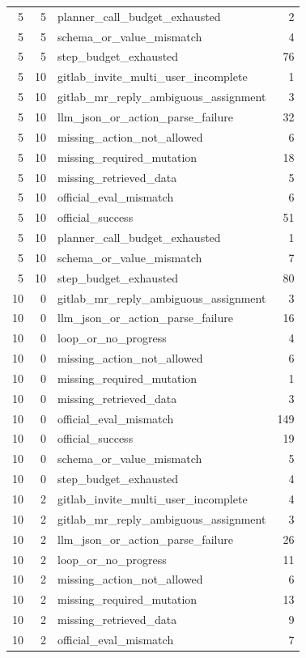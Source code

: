 \begin{tabular}{rrlr}
5 & 5 & planner_call_budget_exhausted & 2 \\
5 & 5 & schema_or_value_mismatch & 4 \\
5 & 5 & step_budget_exhausted & 76 \\
5 & 10 & gitlab_invite_multi_user_incomplete & 1 \\
5 & 10 & gitlab_mr_reply_ambiguous_assignment & 3 \\
5 & 10 & llm_json_or_action_parse_failure & 32 \\
5 & 10 & missing_action_not_allowed & 6 \\
5 & 10 & missing_required_mutation & 18 \\
5 & 10 & missing_retrieved_data & 5 \\
5 & 10 & official_eval_mismatch & 6 \\
5 & 10 & official_success & 51 \\
5 & 10 & planner_call_budget_exhausted & 1 \\
5 & 10 & schema_or_value_mismatch & 7 \\
5 & 10 & step_budget_exhausted & 80 \\
10 & 0 & gitlab_mr_reply_ambiguous_assignment & 3 \\
10 & 0 & llm_json_or_action_parse_failure & 16 \\
10 & 0 & loop_or_no_progress & 4 \\
10 & 0 & missing_action_not_allowed & 6 \\
10 & 0 & missing_required_mutation & 1 \\
10 & 0 & missing_retrieved_data & 3 \\
10 & 0 & official_eval_mismatch & 149 \\
10 & 0 & official_success & 19 \\
10 & 0 & schema_or_value_mismatch & 5 \\
10 & 0 & step_budget_exhausted & 4 \\
10 & 2 & gitlab_invite_multi_user_incomplete & 4 \\
10 & 2 & gitlab_mr_reply_ambiguous_assignment & 3 \\
10 & 2 & llm_json_or_action_parse_failure & 26 \\
10 & 2 & loop_or_no_progress & 11 \\
10 & 2 & missing_action_not_allowed & 6 \\
10 & 2 & missing_required_mutation & 13 \\
10 & 2 & missing_retrieved_data & 9 \\
10 & 2 & official_eval_mismatch & 7 \\

\end{tabular}
